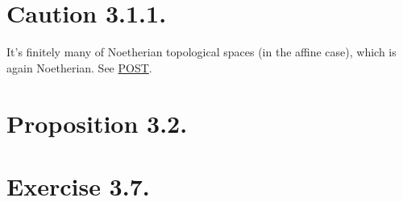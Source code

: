 \section{Caution 3.1.1.}

It's finitely many of Noetherian topological spaces (in the affine case), which is again Noetherian. See \href{https://math.stackexchange.com/questions/3388747/on-the-definition-of-noetherian-scheme}{POST}.

\section{Proposition 3.2.}


\section{Exercise 3.7.}

\textit{}